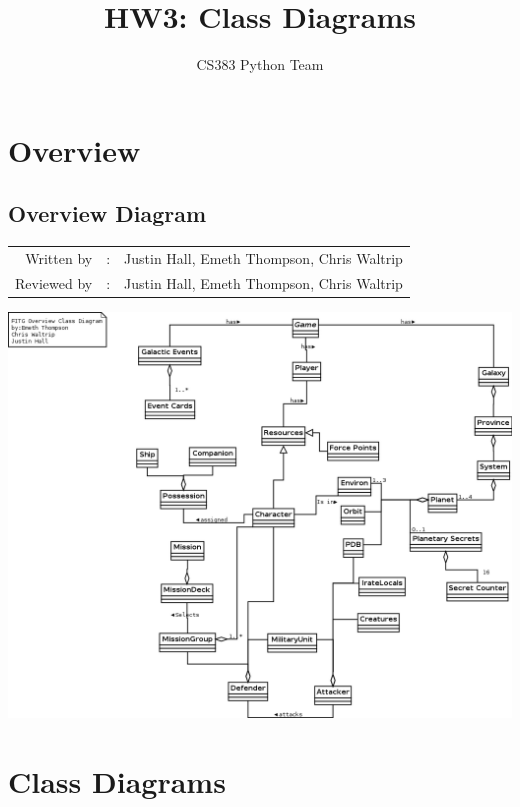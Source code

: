 \documentclass[12pt,letterpaper]{article}
\author{CS383 Python Team}
\title{HW3: Class Diagrams}
\begin{document}
\maketitle
\tableofcontents

\section{Overview}
	\subsection{Overview Diagram}
	\begin{tabularx}{\linewidth}{rcX}
		Written by & : & Justin Hall, Emeth Thompson, Chris Waltrip \\
		Reviewed by & : & Justin Hall, Emeth Thompson, Chris Waltrip \\			 
	\end{tabularx}
			\includegraphics[width=\textwidth,height=\textheight,keepaspectratio]{./images/overview}
	\pagebreak
\pagebreak
\section{Class Diagrams}
\end{document}

